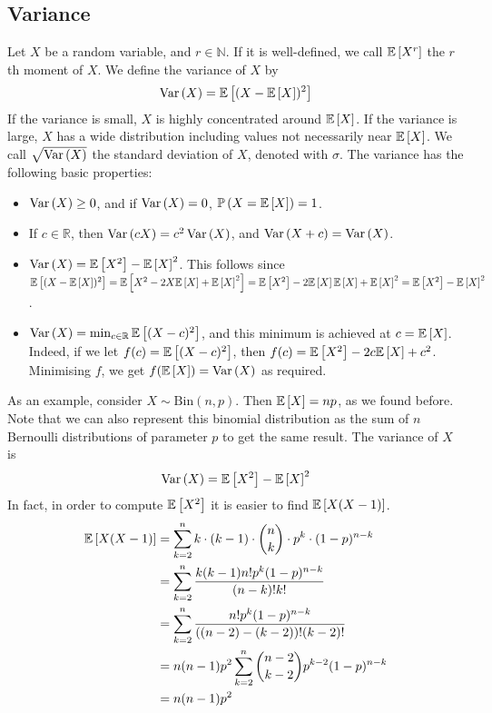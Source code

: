 \subsection{Variance}
Let \(X\) be a random variable, and \(r \in \mathbb N\).
If it is well-defined, we call \(\mathbb{E}\left[{X^r}\right]\) the \(r\)th moment of \(X\).
We define the variance of \(X\) by
\[
	\operatorname{Var}\left({X}\right) = \mathbb{E}\left[{(X - \mathbb{E}\left[{X}\right])^2}\right]
\]
If the variance is small, \(X\) is highly concentrated around \(\mathbb{E}\left[{X}\right]\).
If the variance is large, \(X\) has a wide distribution including values not necessarily near \(\mathbb{E}\left[{X}\right]\).
We call \(\sqrt{\operatorname{Var}\left({X}\right)}\) the standard deviation of \(X\), denoted with \(\sigma\).
The variance has the following basic properties:
\begin{itemize}
	\item \(\operatorname{Var}\left({X}\right) \geq 0\), and if \(\operatorname{Var}\left({X}\right) = 0\), \(\mathbb{P}\left({X = \mathbb{E}\left[{X}\right]}\right) = 1\).
	\item If \(c \in \mathbb R\), then \(\operatorname{Var}\left({cX}\right) = c^2\operatorname{Var}\left({X}\right)\), and \(\operatorname{Var}\left({X + c}\right) = \operatorname{Var}\left({X}\right)\).
	\item \(\operatorname{Var}\left({X}\right) = \mathbb{E}\left[{X^2}\right] - \mathbb{E}\left[{X}\right]^2\).
	      This follows since \(\mathbb{E}\left[{(X - \mathbb{E}\left[{X}\right])^2}\right] = \mathbb{E}\left[{X^2 - 2X\mathbb{E}\left[{X}\right] + \mathbb{E}\left[{X}\right]^2}\right] = \mathbb{E}\left[{X^2}\right] - 2\mathbb{E}\left[{X}\right] \mathbb{E}\left[{X}\right] + \mathbb{E}\left[{X}\right]^2 = \mathbb{E}\left[{X^2}\right] - \mathbb{E}\left[{X}\right]^2\).
	\item \(\operatorname{Var}\left({X}\right) = \min_{c \in \mathbb R} \mathbb{E}\left[{(X - c)^2}\right]\), and this minimum is achieved at \(c = \mathbb{E}\left[{X}\right]\).
	      Indeed, if we let \(f(c) = \mathbb{E}\left[{(X - c)^2}\right]\), then \(f(c) = \mathbb{E}\left[{X^2}\right] - 2c\mathbb{E}\left[{X}\right] + c^2\).
	      Minimising \(f\), we get \(f(\mathbb{E}\left[{X}\right]) = \operatorname{Var}\left({X}\right)\) as required.
\end{itemize}
As an example, consider \(X \sim \mathrm{Bin}(n, p)\).
Then \(\mathbb{E}\left[{X}\right] = np\), as we found before.
Note that we can also represent this binomial distribution as the sum of \(n\) Bernoulli distributions of parameter \(p\) to get the same result.
The variance of \(X\) is
\[
	\operatorname{Var}\left({X}\right) = \mathbb{E}\left[{X^2}\right] - \mathbb{E}\left[{X}\right]^2
\]
In fact, in order to compute \(\mathbb{E}\left[{X^2}\right]\) it is easier to find \(\mathbb{E}\left[{X(X-1)}\right]\).
\begin{align*}
	\mathbb{E}\left[{X(X-1)}\right] & = \sum_{k=2}^n k \cdot (k-1) \cdot \binom{n}{k} \cdot p^k \cdot (1-p)^{n-k} \\
	                & = \sum_{k=2}^n \frac{k(k-1)n!
	p^k (1-p)^{n-k}}{(n-k)!k!}                                                                    \\
	                & = \sum_{k=2}^n \frac{n!
	p^k (1-p)^{n-k}}{((n-2)-(k-2))!(k-2)!}                                                        \\
	                & = n(n-1)p^2 \sum_{k=2}^n \binom{n-2}{k-2} p^{k-2} (1-p)^{n-k}               \\
	                & = n(n-1)p^2
\end{align*}
